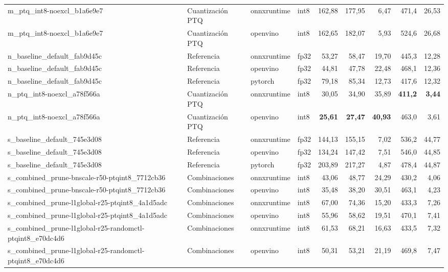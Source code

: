 \begin{landscape}
\begin{table}[htbp]
\begin{adjustbox}{max width=\linewidth, max totalheight=\dimexpr\textheight-\ht\tfmedgetitle-\dp\tfmedgetitle-\ht\tfmedgenotes-\dp\tfmedgenotes-6pt\relax}
\begin{tabular}{llllrrrrr}
    m\_ptq\_int8-noexcl\_b1a6e9e7 & Cuantización PTQ & onnxruntime & int8 & 162,88 & 177,95 & 6,47 & 471,4 & 26,53 \\
    m\_ptq\_int8-noexcl\_b1a6e9e7 & Cuantización PTQ & openvino & int8 & 162,65 & 182,07 & 5,93 & 524,6 & 26,68 \\
    n\_baseline\_default\_fab9d45c & Referencia & onnxruntime & fp32 & 53,27 & 58,47 & 19,70 & 445,3 & 12,28 \\
    n\_baseline\_default\_fab9d45c & Referencia & openvino & fp32 & 44,81 & 47,78 & 22,48 & 468,1 & 12,36 \\
    n\_baseline\_default\_fab9d45c & Referencia & pytorch & fp32 & 79,18 & 85,34 & 12,73 & 417,6 & 12,32 \\
    n\_ptq\_int8-noexcl\_a78f566a & Cuantización PTQ & onnxruntime & int8 & 30,05 & 34,90 & 35,89 & \textbf{411,2} & \textbf{3,44} \\
    n\_ptq\_int8-noexcl\_a78f566a & Cuantización PTQ & openvino & int8 & \textbf{25,61} & \textbf{27,47} & \textbf{40,93} & 463,0 & 3,61 \\
    s\_baseline\_default\_745e3d08 & Referencia & onnxruntime & fp32 & 144,13 & 155,15 & 7,02 & 536,2 & 44,77 \\
    s\_baseline\_default\_745e3d08 & Referencia & openvino & fp32 & 134,24 & 147,42 & 7,51 & 546,0 & 44,85 \\
    s\_baseline\_default\_745e3d08 & Referencia & pytorch & fp32 & 203,89 & 217,27 & 4,87 & 478,4 & 44,87 \\
    s\_combined\_prune-bnscale-r50-ptqint8\_7712cb36 & Combinaciones & onnxruntime & int8 & 43,06 & 48,77 & 24,29 & 430,2 & 4,06 \\
    s\_combined\_prune-bnscale-r50-ptqint8\_7712cb36 & Combinaciones & openvino & int8 & 35,48 & 38,20 & 30,51 & 463,1 & 4,23 \\
    s\_combined\_prune-l1global-r25-ptqint8\_4a1d5adc & Combinaciones & onnxruntime & int8 & 67,00 & 74,36 & 15,20 & 433,3 & 7,26 \\
    s\_combined\_prune-l1global-r25-ptqint8\_4a1d5adc & Combinaciones & openvino & int8 & 55,96 & 58,62 & 19,51 & 470,1 & 7,41 \\
    s\_combined\_prune-l1global-r25-randomctl-ptqint8\_e70dc4d6 & Combinaciones & onnxruntime & int8 & 61,53 & 68,21 & 16,63 & 433,5 & 7,32 \\
    s\_combined\_prune-l1global-r25-randomctl-ptqint8\_e70dc4d6 & Combinaciones & openvino & int8 & 50,31 & 53,21 & 21,19 & 469,8 & 7,47 \\

\end{tabular}
\end{adjustbox}
\end{table}
\end{landscape}

